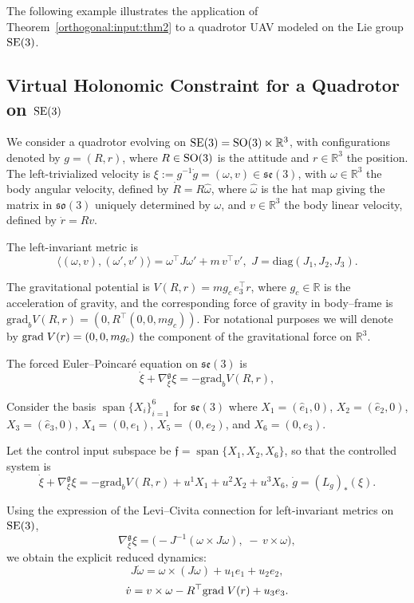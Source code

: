 \documentclass[letterpaper, 10 pt, conference]{ieeeconf}
\newcommand{\R}{\mathbb{R}}
\newcommand{\grad}{\normalfont{\text{grad}}}
\newcommand{\SO}{\normalfont{\text{SO}}}
\newcommand{\SE}{\normalfont{\text{SE}}}
\begin{document}
The following example illustrates the application of Theorem~\ref{orthogonal:input:thm2} 
to a quadrotor UAV modeled on the Lie group $\SE(3)$.

\subsection{Virtual Holonomic Constraint for a Quadrotor on $\SE(3)$}\label{UAV holonomic example}

We consider a quadrotor evolving on $\SE(3)=\SO(3)\ltimes\mathbb{R}^3$, with configurations denoted by $g=(R,r)$, where $R\in\SO(3)$ is the attitude and $r\in\mathbb{R}^3$ the position.  
The left-trivialized velocity is $\xi := g^{-1}\dot g = (\omega,v)\in\mathfrak{se}(3)$, with $\omega\in\mathbb{R}^3$ the body angular velocity, defined by $\dot R = R\widehat{\omega}$, where $\widehat{\omega}$ is the hat map giving the matrix in $\mathfrak{so}(3)$ uniquely determined by $\omega$, and $v\in\mathbb{R}^3$ the body linear velocity, defined by $\dot r = R v$.

The left-invariant metric is
\[
\langle (\omega,v),(\omega',v')\rangle 
  = \omega^\top J \omega' + m\, v^\top v',
\,\,
J=\mathrm{diag}(J_1,J_2,J_3).
\]

The gravitational potential is $V(R,r)=m g_c\, e_3^\top r$, where $g_c \in \R$ is the acceleration of gravity, and the corresponding force of gravity in body--frame is 
$\text{grad}_{b} V(R,r)=(0,R^{\top}(0,0,mg_c)).$ For notational purposes we will denote by $\grad \; V (r) = (0,0,mg_c)$ the component of the gravitational force  on $\R^{3}$.

The forced Euler--Poincar\'e equation on $\mathfrak{se}(3)$ is
\[
\dot\xi+\nabla^{\mathfrak g}_\xi\xi = -\text{grad}_{b} V(R,r),
\]

Consider the basis $\operatorname{span}\{X_i\}_{i=1}^{6}$ for $\mathfrak{se}(3)$ where $X_1=(\widehat e_1,0)$, $X_2=(\widehat e_2,0)$, $X_3=(\widehat e_3,0)$, $X_4=(0,e_1)$, $X_5=(0,e_2)$, and $X_6=(0,e_3)$.

Let the control input subspace be $\mathfrak f=\operatorname{span}\{X_1,X_2,X_6\}$, so that 
the controlled system is
\begin{equation}\label{eq:hol-quad-left}
\dot\xi + \nabla^{\mathfrak g}_\xi\xi = -\text{grad}_{b} V(R,r)
+u^1 X_1+u^2 X_2+u^3 X_6,\,\dot g = (L_g)_\ast(\xi).
\end{equation}

Using the expression of the Levi--Civita connection for left-invariant metrics on $\SE(3)$,
\[
\nabla^{\mathfrak g}_\xi\xi
=\big(-J^{-1}(\omega\times J\omega),\; -\, v\times \omega\big),
\]
we obtain the explicit reduced dynamics:
\[
J\dot\omega = \omega\times(J\omega) + u_1 e_1 + u_2 e_2,
\]
\[
\dot v = v\times\omega - R^{\top}\grad \; V(r) + u_3 e_3.
\]
\end{document}
